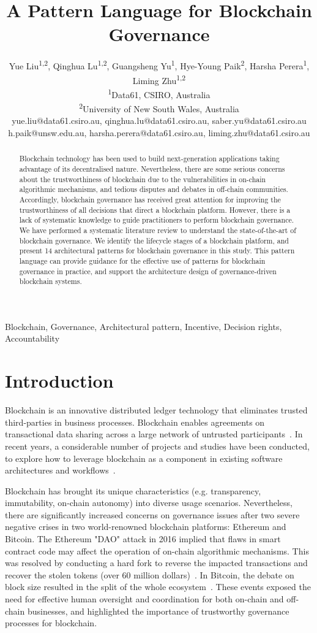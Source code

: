\documentclass{article}
\title{A Pattern Language for Blockchain Governance}
\author{Yue Liu\textsuperscript{1,2}, Qinghua Lu\textsuperscript{1,2}, Guangsheng Yu\textsuperscript{1}, Hye-Young Paik\textsuperscript{2}, Harsha Perera\textsuperscript{1}, Liming Zhu\textsuperscript{1,2}\\
\textsuperscript{1}Data61, CSIRO, Australia\\
\textsuperscript{2}University of New South Wales, Australia\\
yue.liu@data61.csiro.au, qinghua.lu@data61.csiro.au,
saber.yu@data61.csiro.au\\
h.paik@unsw.edu.au,
harsha.perera@data61.csiro.au,
liming.zhu@data61.csiro.au}
\begin{document}
\maketitle

\begin{abstract}
Blockchain technology has been used to build next-generation applications taking advantage of its decentralised nature. Nevertheless, there are some serious concerns about the trustworthiness of blockchain due to the vulnerabilities in on-chain algorithmic mechanisms, and tedious disputes and debates in off-chain communities. Accordingly, blockchain governance has received great attention for improving the trustworthiness of all decisions that direct a blockchain platform. However, there is a lack of systematic knowledge to guide practitioners to perform blockchain governance. We have performed a systematic literature review to understand the state-of-the-art of blockchain governance. We identify the lifecycle stages of a blockchain platform, and present 14 architectural patterns for blockchain governance in this study. This pattern language can provide guidance for the effective use of patterns for blockchain governance in practice, and support the architecture design of governance-driven blockchain systems.

\end{abstract}

Blockchain, Governance, Architectural pattern, Incentive, Decision rights, Accountability

\section{Introduction}
Blockchain is an innovative distributed ledger technology that eliminates trusted third-parties in business processes. Blockchain enables agreements on transactional data sharing across a large network of untrusted participants~\cite{scheuermann2015iacr}. In recent years, a considerable number of projects and studies have been conducted, to explore how to leverage blockchain as a component in existing software architectures and workflows~\cite{2019-Bratanova-ACS}.
 

Blockchain has brought its unique characteristics (e.g. transparency, immutability, on-chain autonomy) into diverse usage scenarios. Nevertheless, there are significantly increased concerns on governance issues after two severe negative crises in two world-renowned blockchain platforms: Ethereum and Bitcoin. The Ethereum "DAO" attack in 2016 implied that flaws in smart contract code may affect the operation of on-chain algorithmic mechanisms. This was resolved by conducting a hard fork to reverse the impacted transactions and recover the stolen tokens (over 60 million dollars)~\cite{DAOattack}. In Bitcoin, the debate on block size resulted in the split of the whole ecosystem~\cite{BitcoinSize}. These events exposed the need for effective human oversight and coordination for both on-chain and off-chain businesses, and highlighted the importance of trustworthy governance processes for blockchain.
\end{document}

